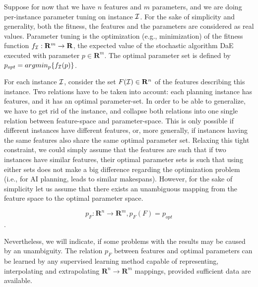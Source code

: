 \documentclass{MYsig-alternate}
\begin{document}
Suppose for now that we have $n$ features and $m$ parameters, and we are doing per-instance parameter tuning on instance $\cal I$. For the sake of simplicity and generality, both the fitness, the features and the parameters are considered as real values. Parameter tuning is the optimization (e.g., minimization) of the fitness function \begin{math}f_{\cal I}:\mathbf{R}^m\to \mathbf{R} \end{math}, the expected value of the stochastic algorithm DaE executed with parameter \begin{math} p \in \mathbf{R}^m \end{math}. The optimal parameter set is defined by \begin{math} p_{opt}=argmin_p\{f_{\cal I}(p)\} \end{math}. 

For each instance $\cal I$, consider the set \begin{math} F({\cal I}) \in \mathbf{R}^n \end{math} of the features describing this instance. 
Two relations have to be taken into account: each planning instance has features, and it has an optimal parameter-set. In order to be able to generalize, we have to get rid of the instance, and collapse both relations into one single relation between feature-space and parameter-space. This is only possible if different instances have different features, or, more generally, if instances having the same features also share the same optimal parameter set. Relaxing this tight constraint, we could simply assume that the features are such that if two instances have similar features, their optimal parameter sets is such that using either sets does not make a big difference regarding the optimization problem (i.e., for AI planning, leads to similar makespans). However, for the sake of simplicity let us assume that there exists an unambiguous mapping from the feature space to the optimal parameter space. 

\begin{equation} p_F: \mathbf{R}^n \to \mathbf{R}^m, p_F(F)=p_{opt} \end{equation}.	

Nevertheless, we will indicate, if some problems with the results may be caused by an unambiguity. The relation \begin{math} p_F \end{math} between features and optimal parameters can be learned by any supervised learning method capable of representing, interpolating and extrapolating  \begin{math}\mathbf{R}^n\to \mathbf{R}^m \end{math} mappings, provided sufficient data are available.
\end{document}
